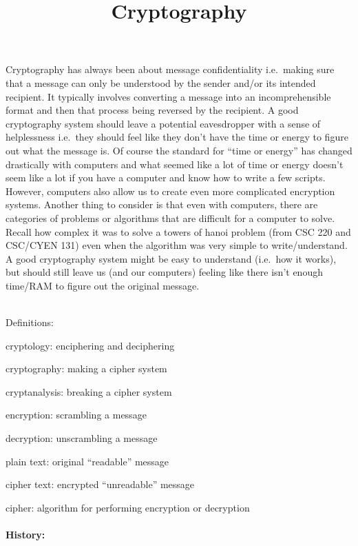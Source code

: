\documentclass[
  letterpaper,
  DIV=11,
  numbers=noendperiod]{scrartcl}
\title{Cryptography}
\author{}
\date{}
\makeatletter
\let\oldparagraph\paragraph
\renewcommand{\paragraph}{
    \@ifstar
      \xxxParagraphStar
      \xxxParagraphNoStar
  }
\newcommand{\xxxParagraphStar}[1]{\oldparagraph*{#1}\mbox{}}
\newcommand{\xxxParagraphNoStar}[1]{\oldparagraph{#1}\mbox{}}
\renewcommand*\contentsname{Table of contents}
\newcommand\contentsname{Table of contents}
\makeatother
\begin{document}
\maketitle

\renewcommand*\contentsname{Table of contents}
{
\hypersetup{linkcolor=}
\setcounter{tocdepth}{3}
\tableofcontents
}

Cryptography has always been about message confidentiality i.e.~making
sure that a message can only be understood by the sender and/or its
intended recipient. It typically involves converting a message into an
incomprehensible format and then that process being reversed by the
recipient. A good cryptography system should leave a potential
eavesdropper with a sense of helplessness i.e.~they should feel like
they don't have the time or energy to figure out what the message is. Of
course the standard for ``time or energy'' has changed drastically with
computers and what seemed like a lot of time or energy doesn't seem like
a lot if you have a computer and know how to write a few scripts.
However, computers also allow us to create even more complicated
encryption systems. Another thing to consider is that even with
computers, there are categories of problems or algorithms that are
difficult for a computer to solve. Recall how complex it was to solve a
towers of hanoi problem (from CSC 220 and CSC/CYEN 131) even when the
algorithm was very simple to write/understand. A good cryptography
system might be easy to understand (i.e.~how it works), but should still
leave us (and our computers) feeling like there isn't enough time/RAM to
figure out the original message.\\
\strut \\
Definitions:

cryptology: enciphering and deciphering

cryptography: making a cipher system

cryptanalysis: breaking a cipher system

encryption: scrambling a message

decryption: unscrambling a message

plain text: original ``readable'' message

cipher text: encrypted ``unreadable'' message

cipher: algorithm for performing encryption or decryption

\paragraph{\texorpdfstring{\textbf{History:}}{History:}}\label{history}
\end{document}
